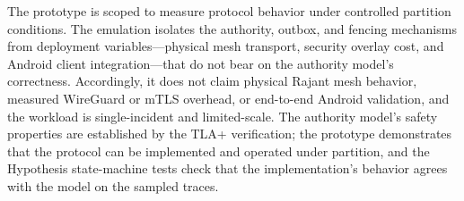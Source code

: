 The prototype is scoped to measure protocol behavior under controlled partition
conditions. The emulation isolates the authority, outbox, and fencing mechanisms
from deployment variables---physical mesh transport, security overlay cost, and
Android client integration---that do not bear on the authority model's
correctness. Accordingly, it does not claim physical Rajant mesh behavior,
measured WireGuard or mTLS overhead, or end-to-end Android validation, and the
workload is single-incident and limited-scale. The authority model's safety
properties are established by the TLA+ verification; the prototype demonstrates
that the protocol can be implemented and operated under partition, and the
Hypothesis state-machine tests check that the implementation's behavior agrees
with the model on the sampled traces.

